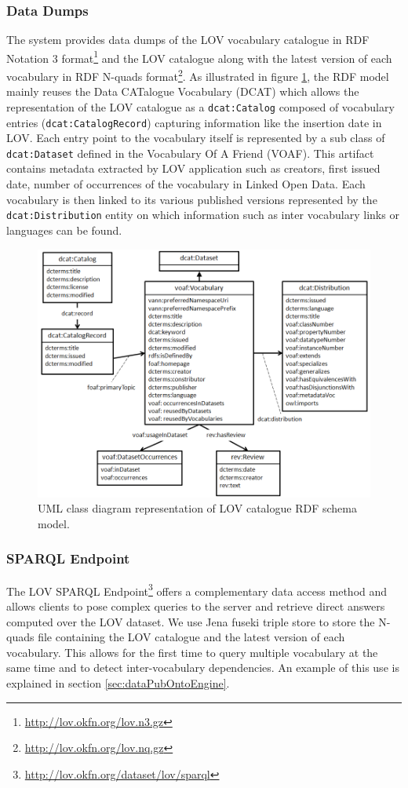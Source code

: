\documentclass{iosart2c}
\begin{document}
\subsubsection{Data Dumps}
The system provides data dumps of the LOV vocabulary catalogue in RDF Notation 3 format\footnote{\url{http://lov.okfn.org/lov.n3.gz}} and the LOV catalogue along with the latest version of each vocabulary in RDF N-quads format\footnote{\url{http://lov.okfn.org/lov.nq.gz}}. As illustrated in figure \ref{fig:model}, the RDF model mainly reuses the Data CATalogue Vocabulary (DCAT) which allows the representation of the LOV catalogue as a \texttt{dcat:Catalog} composed of vocabulary entries (\texttt{dcat:CatalogRecord}) capturing information like the insertion date in LOV. Each entry point to the vocabulary itself is represented by a sub class of \texttt{dcat:Dataset} defined in the Vocabulary Of A Friend (VOAF). This artifact contains metadata extracted by LOV application such as creators, first issued date, number of occurrences of the vocabulary in Linked Open Data. Each vocabulary is then linked to its various published versions represented by the \texttt{dcat:Distribution} entity on which information such as inter vocabulary links or languages can be found.

\begin{figure}[!htb]
\includegraphics[scale=0.5]{model.png}
\caption{UML class diagram representation of LOV catalogue RDF schema model.}
\label{fig:model}
\end{figure}


\subsubsection{SPARQL Endpoint}
The LOV SPARQL Endpoint\footnote{\url{http://lov.okfn.org/dataset/lov/sparql}} offers a complementary data access method and allows clients to pose complex queries to the server and retrieve direct answers computed over the LOV dataset. We use Jena fuseki triple store to store the N-quads file containing the LOV catalogue and the latest version of each vocabulary. This allows for the first time to query multiple vocabulary at the same time and to detect inter-vocabulary dependencies. An example of this use is explained in section \ref{sec:dataPubOntoEngine}.
\end{document}
